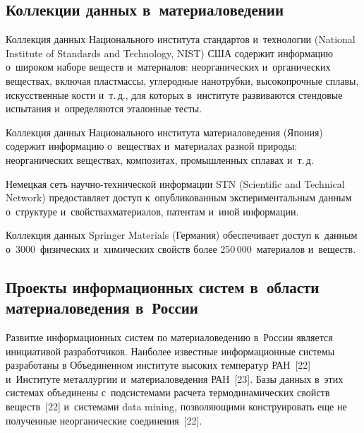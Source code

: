 \begin{multicols}{2}
\vspace*{-3pt}
  
\subsection{Коллекции данных в~материаловедении}

\vspace*{-1pt}

  Коллекция данных Национального института стандартов и~технологии (National
  Institute of Standards and Technology, NIST) США 
содержит информацию о~широком наборе веществ и~материалов: неорганических 
и~органических веществах, включая пластмассы, углеродные нанотрубки, высокопрочные 
сплавы, искусственные кости и~т.\,д., для которых в~институте развиваются стендовые 
испытания и~определяются эталонные тесты.
  
  Коллекция данных Национального института материаловедения (Япония) содержит 
информацию о~веществах и~материалах разной природы: неорганических веществах, 
композитах, промышленных сплавах и~т.\,д.
  
  Немецкая сеть на\-уч\-но-тех\-ни\-че\-ской инфор\-мации STN 
  (Scientific and Technical Network) предо\-став\-ля\-ет доступ 
к~опубликованным экспери\-ментальным данным о~структуре и~свойствах\linebreak материалов, 
патентам и~иной информации.
  
  Коллекция данных Springer Materials (Германия) обеспечивает доступ к~данным 
о~3000~физических и~химических свойств более 250\,000~материалов и~веществ.

\vspace*{-4pt}
  
\subsection{Проекты информационных систем в~области материаловедения 
в~России}

\vspace*{-2pt}

  Развитие информационных систем по материаловедению в~России является 
инициативой разработчиков. Наиболее известные информационные системы разработаны 
в Объединенном институте высоких температур РАН~[22] и~Институте металлургии 
и~материаловедения РАН~[23]. Базы данных в~этих системах объединены с~подсистемами 
расчета термодинамических свойств веществ~[22] и~системами data mining, 
позволяющими конструировать еще не полученные неорганические соединения~[22].


\end{multicols}
